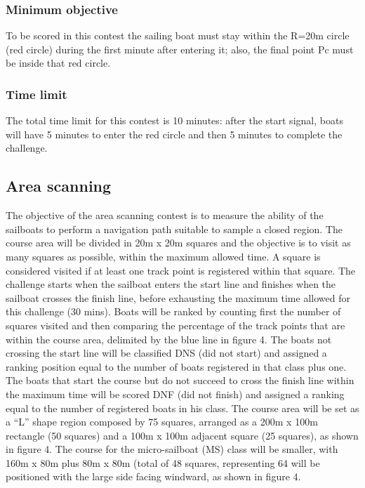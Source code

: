 \documentclass[12pt]{article}
\begin{document}
\subsubsection{Minimum objective}
To be scored in this contest the sailing boat must stay within the R=20m circle
(red circle)
during the first minute after entering it; also, the final point Pc must be
inside that red circle.
\subsubsection{Time limit}
The total time limit for this contest is 10 minutes: after the start signal,
boats will have 5
minutes to enter the red circle and then 5 minutes to complete the challenge.

\subsection{Area scanning}

The objective of the area scanning contest is to measure the ability of the
sailboats to perform
a navigation path suitable to sample a closed region. The course area will be
divided in 20m x
20m squares and the objective is to visit as many squares as possible, within
the maximum
allowed time. A square is considered visited if at least one track point is
registered within that
square.
The challenge starts when the sailboat enters the start line and finishes when
the sailboat
crosses the finish line, before exhausting the maximum time allowed for this
challenge (30
mins). Boats will be ranked by counting first the number of squares visited and
then comparing the percentage of the track points that are within the course
area, delimited by the
blue line in figure 4. The boats not crossing the start line will be classified
DNS (did not start)
and assigned a ranking position equal to the number of boats registered in that
class plus one.
The boats that start the course but do not succeed to cross the finish line
within the maximum
time will be scored DNF (did not finish) and assigned a ranking equal to the
number of registered
boats in his class. The course area will be set as a “L” shape region composed
by 75 squares, arranged as a 200m
x 100m rectangle (50 squares) and a 100m x 100m adjacent square (25 squares), as
shown in
figure 4. The course for the micro-sailboat (MS) class will be smaller, with
160m x 80m plus 80m
x 80m (total of 48 squares, representing 64%
will be positioned
with the large side facing windward, as shown in figure 4.
\end{document}
